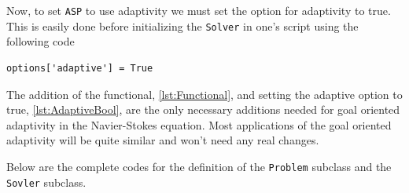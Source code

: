     Now, to set \texttt{ASP} to use adaptivity we must set the option for
    adaptivity to true. This is easily done before initializing the
    \texttt{Solver} in one's script using the following code
    \begin{lstlisting}[label={lst:AdaptiveBool},
                       caption={Setting the the adaptive boolean to true.}]
        options['adaptive'] = True
    \end{lstlisting}

    The addition of the functional, \autoref{lst:Functional}, and setting the
    adaptive option to true, \autoref{lst:AdaptiveBool}, are the only necessary
    additions needed for goal oriented adaptivity in the Navier-Stokes equation.
    Most applications of the goal oriented adaptivity will be quite similar and
    won't need any real changes.

    Below are the complete codes for the definition of the \texttt{Problem}
    subclass and the \texttt{Sovler} subclass.
    

    

